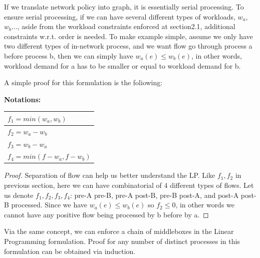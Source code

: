 \documentclass{sig-alternate}
\begin{document}
If we translate network policy into graph, it is essentially serial processing. To ensure serial processing, if we can have several different types of workloads, $w_a$, $w_b\dots$, aside from the workload constraints enforced at section2.1, additional constraints w.r.t. order is needed. To make example simple, assume we only have two different types of in-network process, and we want flow go through process a before process b, then we can simply have $w_a(e) \leq w_b(e)$, in other words, workload demand for a has to be smaller or equal to workload demand for b. 

A simple proof for this formulation is the foliowing:

\textbf{Notations:}

\begin{tabular} {|l |}
\hline
$ f_1=min (w_a, w_b)$\\ \hline
$ f_2 = w_a - w_b$ \\\hline
$ f_3 =w_b - w_a $ \\ \hline
$ f_4 = min (f -w_a ,f - w_b) $ \\ \hline
\end{tabular}
\newline


\begin{proof} Separation of flow can help us better understand the LP. Like $f_1, f_2$ in previous section, here we can have combinatorial of 4 different types of flows. Let us denote $f_1, f_2, f_3, f_4$: pre-A pre-B, pre-A post-B, pre-B post-A, and post-A post-B processed. Since we have  $w_a(e) \leq w_b(e)$ so $f_2\leq 0$, in other words we cannot have any positive flow being processed by b before by a.
\end{proof}
 
 Via the same concept, we can enforce a chain of middleboxes in the Linear Programming formulation. Proof for any number of distinct processes in this formulation can be obtained via induction.
\end{document}
